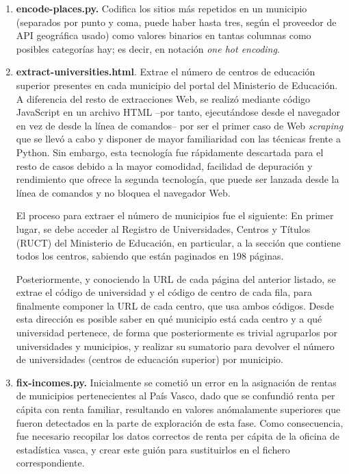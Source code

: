 \begin{enumerate}
    \item \textbf{encode-places.py.} Codifica los sitios más repetidos en un municipio (separados por punto y coma, puede haber hasta tres, según el proveedor de API geográfica usado) como valores binarios en tantas columnas como posibles categorías hay; es decir, en notación \textit{one hot encoding}.
    
    \item \textbf{extract-universities.html}. Extrae el número de centros de educación superior presentes en cada municipio del portal del Ministerio de Educación. A diferencia del resto de extracciones Web, se realizó mediante código JavaScript en un archivo HTML –por tanto, ejecutándose desde el navegador en vez de desde la línea de comandos– por ser el primer caso de Web \textit{scraping} que se llevó a cabo y disponer de mayor familiaridad con las técnicas frente a Python. Sin embargo, esta tecnología fue rápidamente descartada para el resto de casos debido a la mayor comodidad, facilidad de depuración y rendimiento que ofrece la segunda tecnología, que puede ser lanzada desde la línea de comandos y no bloquea el navegador Web.

    El proceso para extraer el número de municipios fue el siguiente: En primer lugar, se debe acceder al Registro de Universidades, Centros y Títulos (RUCT) del Ministerio de Educación, en particular, a la sección que contiene todos los centros, sabiendo que están paginados en 198 páginas.


    Posteriormente, y conociendo la URL de cada página del anterior listado, se extrae el código de universidad y el código de centro de cada fila, para finalmente componer la URL de cada centro, que usa ambos códigos. Desde esta dirección es posible saber en qué municipio está cada centro y a qué universidad pertenece, de forma que posteriormente es trivial agruparlos por universidades y municipios, y realizar su sumatorio para devolver el número de universidades (centros de educación superior) por municipio.

    
    \item \textbf{fix-incomes.py.} Inicialmente se cometió un error en la asignación de rentas de municipios pertenecientes al País Vasco, dado que se confundió renta per cápita con renta familiar, resultando en valores anómalamente superiores que fueron detectados en la parte de exploración de esta fase. Como consecuencia, fue necesario recopilar los datos correctos de renta per cápita de la oficina de estadística vasca, y crear este guión para sustituirlos en el fichero correspondiente.


\end{enumerate}
